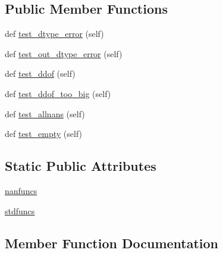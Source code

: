 \subsection*{Public Member Functions}
\begin{DoxyCompactItemize}
\item 
def \hyperlink{classnumpy_1_1lib_1_1tests_1_1test__nanfunctions_1_1TestNanFunctions__MeanVarStd_af158da4e6efc480f24422ddf74404df5}{test\+\_\+dtype\+\_\+error} (self)
\item 
def \hyperlink{classnumpy_1_1lib_1_1tests_1_1test__nanfunctions_1_1TestNanFunctions__MeanVarStd_a464e51913af347dac510b3cc0fff448f}{test\+\_\+out\+\_\+dtype\+\_\+error} (self)
\item 
def \hyperlink{classnumpy_1_1lib_1_1tests_1_1test__nanfunctions_1_1TestNanFunctions__MeanVarStd_a5bc56d59c757fb696ce02daff6f9c96d}{test\+\_\+ddof} (self)
\item 
def \hyperlink{classnumpy_1_1lib_1_1tests_1_1test__nanfunctions_1_1TestNanFunctions__MeanVarStd_a1f4b30416dfb18af0cd8a49ea45fd5f6}{test\+\_\+ddof\+\_\+too\+\_\+big} (self)
\item 
def \hyperlink{classnumpy_1_1lib_1_1tests_1_1test__nanfunctions_1_1TestNanFunctions__MeanVarStd_a10df153cb038bfb288ac2c0838c316cd}{test\+\_\+allnans} (self)
\item 
def \hyperlink{classnumpy_1_1lib_1_1tests_1_1test__nanfunctions_1_1TestNanFunctions__MeanVarStd_aed298186430551f23c1473b0e66250dd}{test\+\_\+empty} (self)
\end{DoxyCompactItemize}
\subsection*{Static Public Attributes}
\begin{DoxyCompactItemize}
\item 
\hyperlink{classnumpy_1_1lib_1_1tests_1_1test__nanfunctions_1_1TestNanFunctions__MeanVarStd_a78a8887fd70ecb4fd682b7747a5da326}{nanfuncs}
\item 
\hyperlink{classnumpy_1_1lib_1_1tests_1_1test__nanfunctions_1_1TestNanFunctions__MeanVarStd_a17df173fd08a67d585a83a96d60c3f38}{stdfuncs}
\end{DoxyCompactItemize}


\subsection{Member Function Documentation}
\mbox{\label{classnumpy_1_1lib_1_1tests_1_1test__nanfunctions_1_1TestNanFunctions__MeanVarStd_a10df153cb038bfb288ac2c0838c316cd}} 
